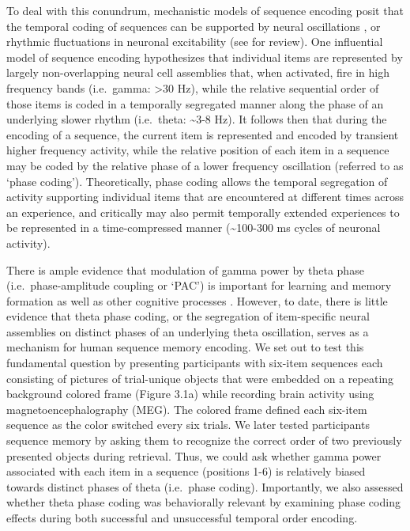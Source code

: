 To deal with this conundrum, mechanistic models of sequence encoding
posit that the temporal coding of sequences can be supported by neural
oscillations
\autocites{lisman_storage_1995}{jensen_hippocampal_1996}{lisman_-_2013}{jensen_physiologically_1996}{koene_first-first-out_2007},
or rhythmic fluctuations in neuronal excitability (see
\textcite{buzsaki_neuronal_2004} for review). One influential model of
sequence encoding \autocites{lisman_storage_1995}{lisman_-_2013}
hypothesizes that individual items are represented by largely
non-overlapping neural cell assemblies that, when activated, fire in
high frequency bands (i.e.~gamma: \textgreater{}30 Hz), while the
relative sequential order of those items is coded in a temporally
segregated manner along the phase of an underlying slower rhythm
(i.e.~theta: \textasciitilde{}3-8 Hz). It follows then that during the
encoding of a sequence, the current item is represented and encoded by
transient higher frequency activity, while the relative position of each
item in a sequence may be coded by the relative phase of a lower
frequency oscillation (referred to as `phase coding'). Theoretically,
phase coding allows the temporal segregation of activity supporting
individual items that are encountered at different times across an
experience, and critically may also permit temporally extended
experiences to be represented in a time-compressed manner
\autocite{jensen_physiologically_1996} (\textasciitilde{}100-300 ms
cycles of neuronal activity).

There is ample evidence that modulation of gamma power by theta phase
(i.e.~phase-amplitude coupling or `PAC') is important for learning and
memory formation
\autocites{axmacher_cross-frequency_2010}{tort_thetagamma_2009}{friese_successful_2013}{fuentemilla_theta-coupled_2010}[gamma\_2014]{lega_slow-theta}
as well as other cognitive processes
\autocites{canolty_high_2006}{giraud_cortical_2012}{szczepanski_dynamic_2014}.
However, to date, there is little evidence that theta phase coding, or
the segregation of item-specific neural assemblies on distinct phases of
an underlying theta oscillation, serves as a mechanism for human
sequence memory encoding. We set out to test this fundamental question
by presenting participants with six-item sequences each consisting of
pictures of trial-unique objects that were embedded on a repeating
background colored frame (Figure 3.1a) while recording brain activity
using magnetoencephalography (MEG). The colored frame defined each
six-item sequence as the color switched every six trials. We later
tested participants sequence memory by asking them to recognize the
correct order of two previously presented objects during retrieval.
Thus, we could ask whether gamma power associated with each item in a
sequence (positions 1-6) is relatively biased towards distinct phases of
theta (i.e.~phase coding). Importantly, we also assessed whether theta
phase coding was behaviorally relevant by examining phase coding effects
during both successful and unsuccessful temporal order encoding.

